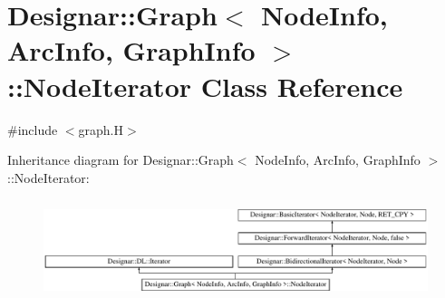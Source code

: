 \hypertarget{class_designar_1_1_graph_1_1_node_iterator}{}\section{Designar\+:\+:Graph$<$ Node\+Info, Arc\+Info, Graph\+Info $>$\+:\+:Node\+Iterator Class Reference}
\label{class_designar_1_1_graph_1_1_node_iterator}


{\ttfamily \#include $<$graph.\+H$>$}

Inheritance diagram for Designar\+:\+:Graph$<$ Node\+Info, Arc\+Info, Graph\+Info $>$\+:\+:Node\+Iterator\+:\begin{figure}[H]
\begin{center}
\leavevmode
\includegraphics[height=2.955145cm]{class_designar_1_1_graph_1_1_node_iterator}
\end{center}
\end{figure}
